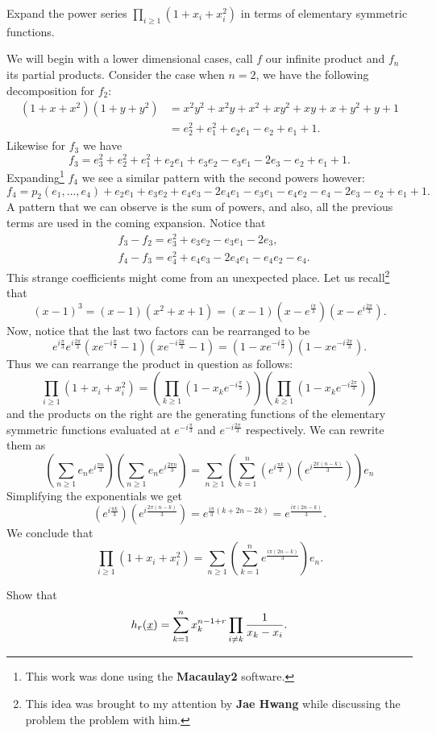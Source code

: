 \documentclass[12pt]{memoir}
\begin{document}
\begin{Ej}
    Expand the power series $\prod_{i\geq 1}(1+x_i+x_i^2)$ in terms of elementary symmetric functions.
   \end{Ej}
\begin{ptcbr}
We will begin with a lower dimensional cases, call $f$ our infinite product and $f_n$ its partial products. Consider the case when $n=2$, we have the following decomposition for $f_2$:
\begin{align*}
    (1+x+x^2)(1+y+y^2)&=x^2 y^2 + x^2 y + x^2 + x y^2 + x y + x + y^2 + y + 1\\
    &=e_2^2+e_1^2+e_2e_1-e_2+e_1+1.
\end{align*}
Likewise for $f_3$ we have 
$$f_3=e_3^2+e_2^2+e_1^2+e_2e_1+e_3e_2-e_3e_1-2e_3-e_2+e_1+1.$$
Expanding\footnote{This work was done using the \textbf{Macaulay2} software.} $f_4$ we see a similar pattern with the second powers however:
$$f_4=p_2(e_1,\dots,e_4)+e_2e_1+e_3e_2+e_4e_3-2e_4e_1-e_3e_1-e_4e_2-e_4-2e_3-e_2+e_1+1.$$
A pattern that we can observe is the sum of powers, and also, all the previous terms are used in the coming expansion. Notice that 
\begin{align*}
&f_3-f_2=e_3^2+e_3e_2-e_3e_1-2e_3,\\
&f_4-f_3=e_4^2+e_4e_3-2e_4e_1-e_4e_2-e_4.    
\end{align*}
This strange coefficients might come from an unexpected place. Let us recall\footnote{This idea was brought to my attention by \textbf{Jae Hwang} while discussing the problem the problem with him.} that 
$$(x-1)^3=(x-1)(x^2+x+1)=(x-1)(x-e^{\frac{i\pi}{3}})(x-e^{i\frac{2\pi}{3}}).$$
Now, notice that the last two factors can be rearranged to be 
$$e^{i\frac{\pi}{3}}e^{i\frac{2\pi}{3}}(xe^{-i\frac{\pi}{3}}-1)(xe^{-i\frac{2\pi}{3}}-1)=(1-xe^{-i\frac{\pi}{3}})(1-xe^{-i\frac{2\pi}{3}}).$$
Thus we can rearrange the product in question as follows:
$$\prod_{i\geq 1}(1+x_i+x_i^2)=\left(\prod_{k\geq 1}(1-x_ke^{-i\frac{\pi}{3}})\right)\left(\prod_{k\geq 1}(1-x_ke^{-i\frac{2\pi}{3}})\right)$$
and the products on the right are the generating functions of the elementary symmetric functions evaluated at $e^{-i\frac{\pi}{3}}$ and $e^{-i\frac{2\pi}{3}}$ respectively. We can rewrite them as 
$$\left(\sum_{n\geq 1}e_ne^{i\frac{\pi n}{3}}\right)\left(\sum_{n\geq 1}e_ne^{i\frac{2\pi n}{3}}\right)=\sum_{n\geq 1}\left(\sum_{k=1}^n\left(e^{i\frac{\pi k}{3}}\right)\left(e^{i\frac{2\pi (n-k)}{3}}\right)\right)e_n$$
Simplifying the exponentials we get 
$$\left(e^{i\frac{\pi k}{3}}\right)\left(e^{i\frac{2\pi (n-k)}{3}}\right)=e^{\frac{i\pi}{3}(k+2n-2k)}=e^{\frac{i\pi(2n-k)}{3}}.$$
We conclude that 
$$\prod_{i\geq 1}(1+x_i+x_i^2)=\sum_{n\geq 1}\left(\sum_{k=1}^ne^{\frac{i\pi(2n-k)}{3}}\right)e_n.$$
\end{ptcbr}
\iffalse
\begin{Ej}
    Show that 
    $$h_r(\underline x)=\sum_{k=1}^nx_k^{n-1+r}\prod_{i\neq k}\frac{1}{x_k-x_i}.$$
\end{Ej}
\end{document}
